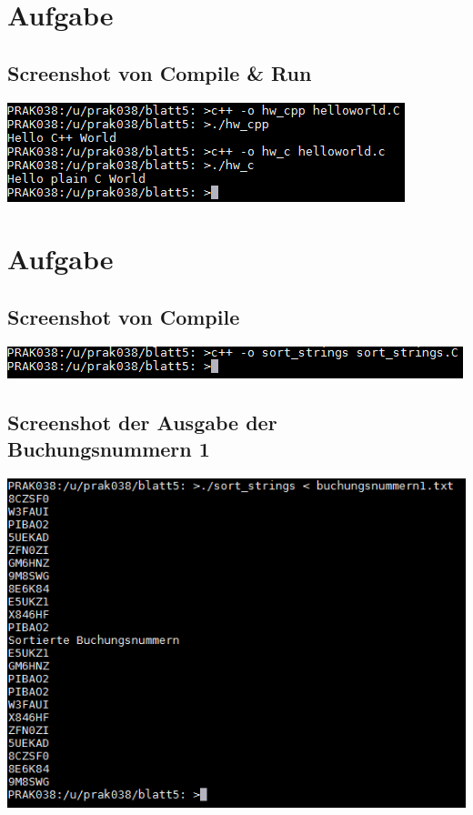 \documentclass[a4paper]{scrartcl}
\begin{document}
	\section{Aufgabe}
	\subsection{Screenshot von Compile \& Run}
	\includegraphics{screenshots/helloworld_compile_and_run.png}
	\section{Aufgabe}
	\subsection{Screenshot von Compile}
	\includegraphics{screenshots/2_COMPILE.png}
	\subsection{Screenshot der Ausgabe der Buchungsnummern 1}
	\includegraphics{screenshots/2_RUN_1.png}
\end{document}
